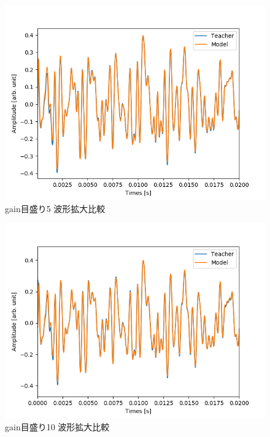 \documentclass{jreport}		%
\begin{document}
\begin{figure}[htbp]
 \begin{center}
  \includegraphics[width=150mm]{gain5_output_hikaku.png}
 \end{center}
 \caption{gain目盛り5 波形拡大比較}
 \label{fig:one}
\end{figure}

\begin{figure}[htbp]
 \begin{center}
  \includegraphics[width=150mm]{gain10_output_hikaku.png}
 \end{center}
 \caption{gain目盛り10 波形拡大比較}
 \label{fig:one}
\end{figure}
\end{document}
